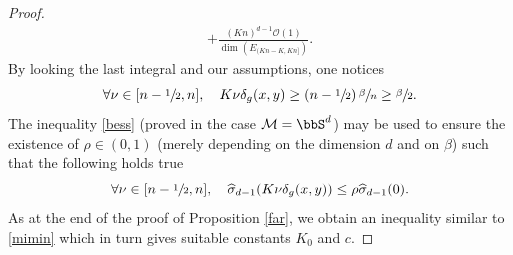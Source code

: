 \begin{proof}
\begin{multline}
+\frac{(Kn)^{d-1}\mathcal{O}(1)}{\dim(E_{(Kn-K,Kn]}) }.
\end{multline}
By looking the last integral and our assumptions, one notices\vspace*{-3pt}
\begin{equation*}
\forall \nu\in[n-\sfrac{1}{2},n], \quad K \nu \delta_g(x,y)\geq \left(n-\sfrac{1}{2}\right)\sfrac{\beta}{n}\geq \sfrac{\beta}{2}.
\end{equation*}
The inequality \eqref{bess} (proved in the case $\mathcal{M}=\bbS^d$) may be used to ensure the existence of $\rho\in (0,1)$ (merely depending on the dimension $d$ and on $\beta$) such that the following holds true\vspace*{-3pt}
\begin{equation*}
\forall \nu\in[n-\sfrac{1}{2},n], \quad \widehat{\sigma}_{d-1}(K \nu \delta_g(x,y))\leq \rho \widehat{\sigma}_{d-1}(0).
\end{equation*}
As at the end of the proof of Proposition \ref{far}, we obtain an inequality similar to \eqref{mimin} which in turn gives suitable constants $K_0$ and $c$.
\end{proof}

